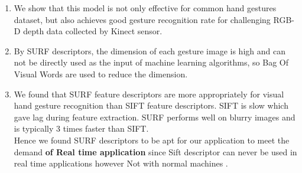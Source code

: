 \begin{enumerate}
\item We show that this model is not only
effective for common hand gestures dataset, but also achieves
good gesture recognition rate for challenging RGB-D depth
data collected by Kinect sensor.
\item By SURF descriptors, the
dimension of each gesture image is high and can not be directly
used as the input of machine learning algorithms, so Bag Of
Visual Words are used to reduce the dimension. 
\item We found
that SURF feature descriptors are more appropriately for visual
hand gesture recognition than SIFT feature descriptors.
SIFT is  slow which  gave lag during feature extraction. SURF performs well on blurry images and is typically 3 times faster than SIFT.\\ Hence we found SURF descriptors to be apt for our application to meet the demand \textbf{of Real time application} since Sift descriptor can never be used in real time applications however Not with normal machines .
\end{enumerate}

